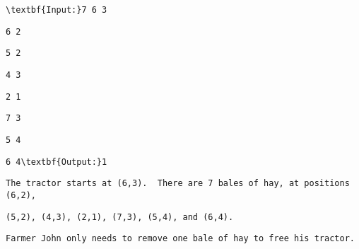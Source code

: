 \begin{verbatim}
\textbf{Input:}7 6 3 \end{verbatim}
\begin{verbatim}
6 2 \end{verbatim}
\begin{verbatim}
5 2 \end{verbatim}
\begin{verbatim}
4 3 \end{verbatim}
\begin{verbatim}
2 1 \end{verbatim}
\begin{verbatim}
7 3 \end{verbatim}
\begin{verbatim}
5 4 \end{verbatim}
\begin{verbatim}
6 4\textbf{Output:}1\end{verbatim}
\begin{verbatim}
The tractor starts at (6,3).  There are 7 bales of hay, at positions (6,2), \end{verbatim}
\begin{verbatim}
(5,2), (4,3), (2,1), (7,3), (5,4), and (6,4).\end{verbatim}
\begin{verbatim}
Farmer John only needs to remove one bale of hay to free his tractor.\end{verbatim}